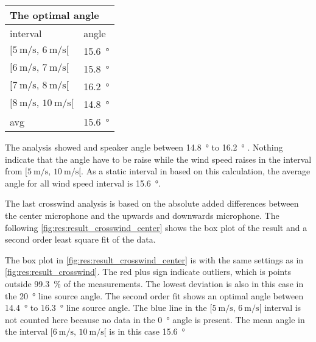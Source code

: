  
 \begin{table}[H]
 \centering
\begin{tabular}{l|l}
\multicolumn{2}{l}{The optimal angle}      \\ \hline
interval & angle \\ \hline
  $[\SI{5}{\meter\per\second},\, \SI{6}{\meter\per\second}[ $       &   \SI{15.6}{\degree}    \\
   $[\SI{6}{\meter\per\second},\, \SI{7}{\meter\per\second}[ $     &   \SI{15.8}{\degree}     \\
  $[\SI{7}{\meter\per\second},\, \SI{8}{\meter\per\second}[ $       &    \SI{16.2}{\degree}    \\
   $[\SI{8}{\meter\per\second},\, \SI{10}{\meter\per\second}[ $      &     \SI{14.8}{\degree}  \\ \hline
    avg      &     \SI{15.6}{\degree} 
\end{tabular}
\label{res:tab:cross_mean_all}
\end{table}     

The analysis showed and speaker angle between \SI{14.8}{\degree} to  \SI{16.2}{\degree} . Nothing indicate that the angle have to be raise while the wind speed raises in the interval from $[\SI{5}{\meter\per\second},\, \SI{10}{\meter\per\second}[ $. As a static interval in based on this calculation, the average angle for all wind speed interval is \SI{15.6}{\degree}.

The last crosswind analysis is based on the absolute added differences between the center microphone and the upwards and downwards microphone. The following \autoref{fig:res:result_crosswind_center} shows the box plot of the result and a second order least square fit of the data. 
 

The box plot in \autoref{fig:res:result_crosswind_center} is with the same settings as in  \autoref{fig:res:result_crosswind}. The red plus sign indicate outliers, which is points outside \SI{99.3}{\percent} of the measurements. The lowest deviation is also in this case in the \SI{20}{\degree} line source angle. The second order fit shows an optimal angle between \SI{14.4}{\degree} to \SI{16.3}{\degree} line source angle. The blue line in the $[\SI{5}{\meter\per\second},\, \SI{6}{\meter\per\second}[ $ interval is not counted here because no data in the \SI{0}{\degree} angle is present. The mean angle in the interval $[\SI{6}{\meter\per\second},\, \SI{10}{\meter\per\second}[ $ is in this case \SI{15.6}{\degree}
  
